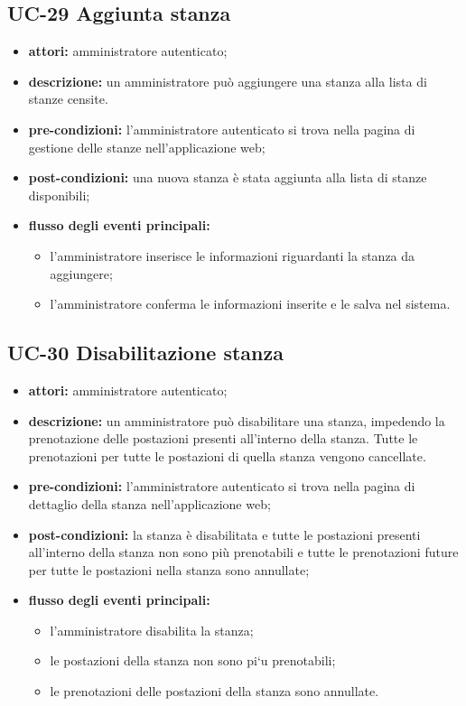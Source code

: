 \subsection{UC-29 Aggiunta stanza}
\begin{itemize}
    \item \textbf{attori:} amministratore autenticato;
    \item \textbf{descrizione:} un amministratore pu\`{o} aggiungere una stanza alla lista di stanze censite.
    \item \textbf{pre-condizioni:} l'amministratore autenticato si trova nella pagina di gestione delle stanze nell'applicazione web;
    \item \textbf{post-condizioni:} una nuova stanza \`{e} stata aggiunta alla lista di stanze disponibili;
    \item \textbf{flusso degli eventi principali:}
    \begin{itemize}
        \item l'amministratore inserisce le informazioni riguardanti la stanza da aggiungere;
        \item l'amministratore conferma le informazioni inserite e le salva nel sistema.
    \end{itemize}
\end{itemize}


\subsection{UC-30 Disabilitazione stanza}
\begin{itemize}
    \item \textbf{attori:} amministratore autenticato;
    \item \textbf{descrizione:} un amministratore pu\`{o} disabilitare una stanza, impedendo la prenotazione delle postazioni presenti all'interno della stanza. Tutte le prenotazioni per tutte le postazioni di quella stanza vengono cancellate.
    \item \textbf{pre-condizioni:} l'amministratore autenticato si trova nella pagina di dettaglio della stanza nell'applicazione web;
    \item \textbf{post-condizioni:} la stanza \`{e} disabilitata e tutte le postazioni presenti all'interno della stanza non sono pi\`{u} prenotabili e tutte le prenotazioni future per tutte le postazioni nella stanza sono annullate;
    \item \textbf{flusso degli eventi principali:}
    \begin{itemize}
        \item l'amministratore disabilita la stanza;
        \item le postazioni della stanza non sono pi`{u} prenotabili;
        \item le prenotazioni delle postazioni della stanza sono annullate.
    \end{itemize}
\end{itemize}



